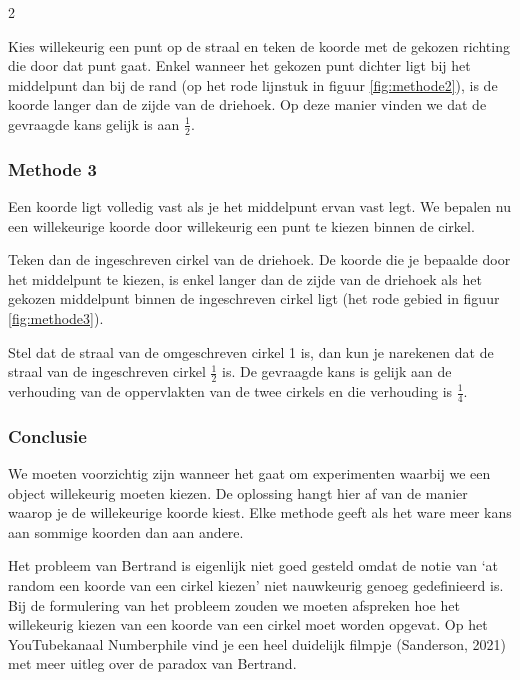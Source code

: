 \begin{multicols}{2}
	
	Kies willekeurig een punt op de straal en teken de koorde met de gekozen richting die door dat punt gaat. Enkel wanneer het gekozen punt dichter ligt bij het middelpunt dan bij de rand (op het rode lijnstuk in figuur \ref{fig:methode2}), is de koorde langer dan de zijde van de driehoek. Op deze manier vinden we dat de gevraagde kans gelijk is aan $\frac{1}{2}$.
	
	 \subsubsection*{Methode 3}
	
		

 \vspace{3cm}


 


	Een koorde ligt volledig vast als je het middelpunt ervan vast legt. We bepalen nu een willekeurige koorde door willekeurig een punt te kiezen binnen de cirkel. 

 	Teken dan de ingeschreven cirkel van de driehoek. De koorde die je bepaalde door het middelpunt te kiezen, is enkel langer dan de zijde van de driehoek als het gekozen middelpunt binnen de ingeschreven cirkel ligt (het rode gebied in figuur \ref{fig:methode3}).
	
	Stel dat de straal van de omgeschreven cirkel 1 is, dan kun je narekenen dat de straal van de ingeschreven cirkel $\frac{1}{2}$ is. De gevraagde kans is gelijk aan de verhouding van de oppervlakten van de twee cirkels en die verhouding is $\frac{1}{4}$.
	
	
	\subsubsection*{Conclusie}
	We moeten voorzichtig zijn wanneer het gaat om experimenten waarbij we een object willekeurig moeten kiezen. De oplossing hangt hier af van de manier waarop je de willekeurige koorde kiest. Elke methode geeft als het ware meer kans aan sommige koorden dan aan andere. 
	
	Het probleem van Bertrand is eigenlijk niet goed gesteld omdat de notie van `at random een koorde van een cirkel kiezen' niet nauwkeurig genoeg gedefinieerd is. Bij de formulering van het probleem zouden we moeten afspreken hoe het willekeurig kiezen van een koorde van een cirkel moet worden opgevat. Op het YouTubekanaal Numberphile vind je een heel duidelijk filmpje (Sanderson, 2021) met meer uitleg over de paradox van Bertrand.
	

\end{multicols}
